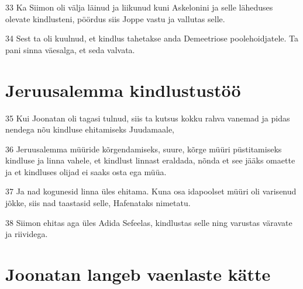 \par 33 Ka Siimon oli välja läinud ja liikunud kuni Askelonini ja selle läheduses olevate kindlusteni, pöördus siis Joppe vastu ja vallutas selle.
\par 34 Sest ta oli kuulnud, et kindlus tahetakse anda Demeetriose poolehoidjatele. Ta pani sinna väesalga, et seda valvata. 

\section*{Jeruusalemma kindlustustöö}

\par 35 Kui Joonatan oli tagasi tulnud, siis ta kutsus kokku rahva vanemad ja pidas nendega nõu kindluse ehitamiseks Juudamaale,
\par 36 Jeruusalemma müüride kõrgendamiseks, suure, kõrge müüri püstitamiseks kindluse ja linna vahele, et kindlust linnast eraldada, nõnda et see jääks omaette ja et kindluses olijad ei saaks osta ega müüa.
\par 37 Ja nad kogunesid linna üles ehitama. Kuna osa idapoolset müüri oli varisenud jõkke, siis nad taastasid selle, Hafenataks nimetatu.
\par 38 Siimon ehitas aga üles Adida Sefeelas, kindlustas selle ning varustas väravate ja riividega. 

\section*{Joonatan langeb vaenlaste kätte}


